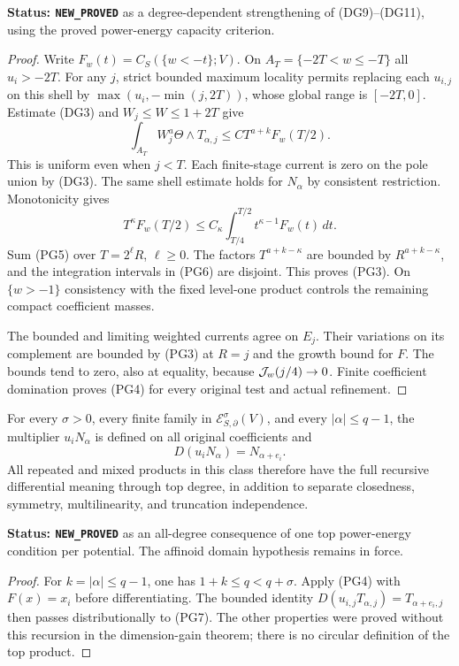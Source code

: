 \noindent\textbf{Status: \texttt{NEW\_PROVED}} as a
degree-dependent strengthening of (DG9)--(DG11), using the
proved power-energy capacity criterion.

\begin{proof}
Write $F_w(t)=C_S(\{w<-t\};V)$. On
$A_T=\{-2T<w\leq-T\}$ all $u_i>-2T$. For any $j$, strict
bounded maximum locality permits replacing each $u_{i,j}$
on this shell by $\max(u_i,-\min(j,2T))$, whose global range
is $[-2T,0]$. Estimate (DG3) and $W_j\leq W\leq1+2T$ give
\[
 \int_{A_T}W_j^a\Theta\wedge T_{\alpha,j}
       \leq C T^{a+k}F_w(T/2).
 \tag{PG5}
\]
This is uniform even when $j<T$. Each finite-stage current is
zero on the pole union by (DG3). The same shell estimate holds
for $N_\alpha$ by consistent restriction. Monotonicity gives
\[
 T^\kappa F_w(T/2)
       \leq C_\kappa\int_{T/4}^{T/2}
                         t^{\kappa-1}F_w(t)\,dt.
 \tag{PG6}
\]
Sum (PG5) over $T=2^\ell R$, $\ell\geq0$. The factors
$T^{a+k-\kappa}$ are bounded by $R^{a+k-\kappa}$, and the
integration intervals in (PG6) are disjoint. This proves (PG3).
On $\{w>-1\}$ consistency with the fixed level-one product
controls the remaining compact coefficient masses.

The bounded and limiting weighted currents agree on $E_j$.
Their variations on its complement are bounded by (PG3) at
$R=j$ and the growth bound for $F$. The bounds tend to zero,
also at equality, because $ {\cal J}_w(j/4)\to0$.
Finite coefficient domination proves (PG4) for every original
test and actual refinement.
\end{proof}

\begin{theorem}
\label{thm:r11-power-full-recursion}
For every $\sigma>0$, every finite family in
$\mathcal E^\sigma_{S,\partial}(V)$, and every
$|\alpha|\leq q-1$, the multiplier $u_iN_\alpha$ is defined
on all original coefficients and
\[
                         D(u_iN_\alpha)=N_{\alpha+e_i}.
 \tag{PG7}
\]
All repeated and mixed products in this class therefore have
the full recursive differential meaning through top degree,
in addition to separate closedness, symmetry, multilinearity,
and truncation independence.
\end{theorem}

\noindent\textbf{Status: \texttt{NEW\_PROVED}} as an
all-degree consequence of one top power-energy condition per
potential. The affinoid domain hypothesis remains in force.

\begin{proof}
For $k=|\alpha|\leq q-1$, one has $1+k\leq q<q+\sigma$.
Apply (PG4) with $F(x)=x_i$ before differentiating. The bounded
identity $D(u_{i,j}T_{\alpha,j})=T_{\alpha+e_i,j}$ then passes
distributionally to (PG7). The other properties were proved
without this recursion in the dimension-gain theorem; there
is no circular definition of the top product.
\end{proof}

